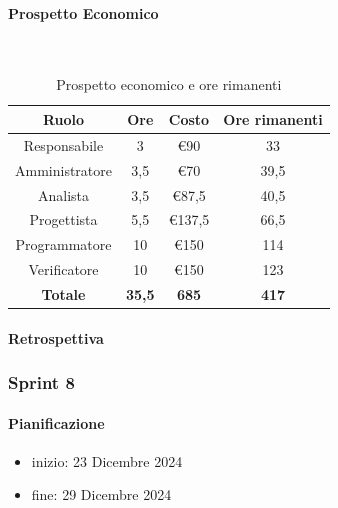 \documentclass{article}
\begin{document}
                \paragraph{Prospetto Economico}\mbox{}\\
                \begin{table}[H]
                    \centering
                    \begin{tabular}{|c|c|c|c|}
                    \hline
                    \textbf{Ruolo}  & \textbf{Ore}  & \textbf{Costo} & \textbf{Ore rimanenti} \\ \hline
                    Responsabile    & 3             & €90            & 33                     \\ \hline
                    Amministratore  & 3,5           & €70            & 39,5                   \\ \hline
                    Analista        & 3,5           & €87,5          & 40,5                   \\ \hline
                    Progettista     & 5,5           & €137,5         & 66,5                   \\ \hline
                    Programmatore   & 10            & €150           & 114                    \\ \hline
                    Verificatore    & 10            & €150           & 123                    \\ \hline
                    \textbf{Totale} & \textbf{35,5} & \textbf{685}   & \textbf{417}         \\ \hline
                    \end{tabular}
                    \caption{Prospetto economico e ore rimanenti}
                \end{table}

                \paragraph{Retrospettiva}
            \subsubsection{Sprint 8}
                \paragraph{Pianificazione}
                \begin{itemize}
                    \item inizio: 23 Dicembre 2024
                    \item fine: 29 Dicembre 2024
                \end{itemize}
\end{document}
